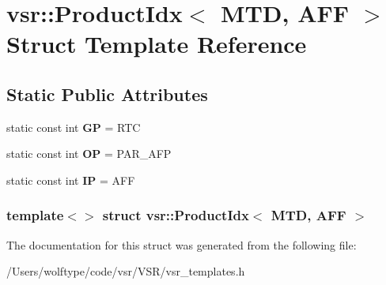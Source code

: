 \hypertarget{structvsr_1_1_product_idx_3_01_m_t_d_00_01_a_f_f_01_4}{\section{vsr\-:\-:Product\-Idx$<$ M\-T\-D, A\-F\-F $>$ Struct Template Reference}
\label{structvsr_1_1_product_idx_3_01_m_t_d_00_01_a_f_f_01_4}
}
\subsection*{Static Public Attributes}
\begin{DoxyCompactItemize}
\item 
\hypertarget{structvsr_1_1_product_idx_3_01_m_t_d_00_01_a_f_f_01_4_aa3bb9cd02bc79ee7f933e1461b8b44fe}{static const int {\bfseries G\-P} = R\-T\-C}\label{structvsr_1_1_product_idx_3_01_m_t_d_00_01_a_f_f_01_4_aa3bb9cd02bc79ee7f933e1461b8b44fe}

\item 
\hypertarget{structvsr_1_1_product_idx_3_01_m_t_d_00_01_a_f_f_01_4_aee7d1150e5fc8c33292e7d6e96d6dd78}{static const int {\bfseries O\-P} = P\-A\-R\-\_\-\-A\-F\-P}\label{structvsr_1_1_product_idx_3_01_m_t_d_00_01_a_f_f_01_4_aee7d1150e5fc8c33292e7d6e96d6dd78}

\item 
\hypertarget{structvsr_1_1_product_idx_3_01_m_t_d_00_01_a_f_f_01_4_acf0cdcf2cb27342e1b4ef47690018ab4}{static const int {\bfseries I\-P} = A\-F\-F}\label{structvsr_1_1_product_idx_3_01_m_t_d_00_01_a_f_f_01_4_acf0cdcf2cb27342e1b4ef47690018ab4}

\end{DoxyCompactItemize}
\subsubsection*{template$<$$>$ struct vsr\-::\-Product\-Idx$<$ M\-T\-D, A\-F\-F $>$}



The documentation for this struct was generated from the following file\-:\begin{DoxyCompactItemize}
\item 
/\-Users/wolftype/code/vsr/\-V\-S\-R/vsr\-\_\-templates.\-h\end{DoxyCompactItemize}
